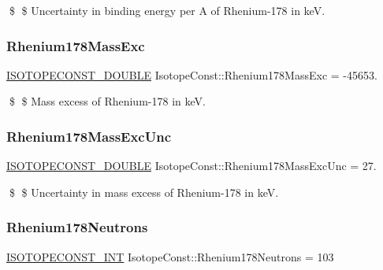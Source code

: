\$ \$ Uncertainty in binding energy per A of Rhenium-\/178 in keV. \mbox{\label{group___isotope_const-_rhenium-_re178_ga1ec4dd84a23ef1518d643be5cad525b4}} 
\subsubsection{\texorpdfstring{Rhenium178\+Mass\+Exc}{Rhenium178MassExc}}
{\footnotesize\ttfamily \mbox{\hyperlink{group___isotope_const-_macros_ga8f45a7272ce02c0b4c65c44636ed719a}{I\+S\+O\+T\+O\+P\+E\+C\+O\+N\+S\+T\+\_\+\+D\+O\+U\+B\+LE}} Isotope\+Const\+::\+Rhenium178\+Mass\+Exc = -\/45653.}

\$ \$ Mass excess of Rhenium-\/178 in keV. \mbox{\label{group___isotope_const-_rhenium-_re178_ga613044f385ca0fa306cb3171c2bb019b}} 
\subsubsection{\texorpdfstring{Rhenium178\+Mass\+Exc\+Unc}{Rhenium178MassExcUnc}}
{\footnotesize\ttfamily \mbox{\hyperlink{group___isotope_const-_macros_ga8f45a7272ce02c0b4c65c44636ed719a}{I\+S\+O\+T\+O\+P\+E\+C\+O\+N\+S\+T\+\_\+\+D\+O\+U\+B\+LE}} Isotope\+Const\+::\+Rhenium178\+Mass\+Exc\+Unc = 27.}

\$ \$ Uncertainty in mass excess of Rhenium-\/178 in keV. \mbox{\label{group___isotope_const-_rhenium-_re178_gac9e94ecd2246600af9c36324be3462f5}} 
\subsubsection{\texorpdfstring{Rhenium178\+Neutrons}{Rhenium178Neutrons}}
{\footnotesize\ttfamily \mbox{\hyperlink{group___isotope_const-_macros_ga5f18360b3e99483a35c32d789e62621c}{I\+S\+O\+T\+O\+P\+E\+C\+O\+N\+S\+T\+\_\+\+I\+NT}} Isotope\+Const\+::\+Rhenium178\+Neutrons = 103}

